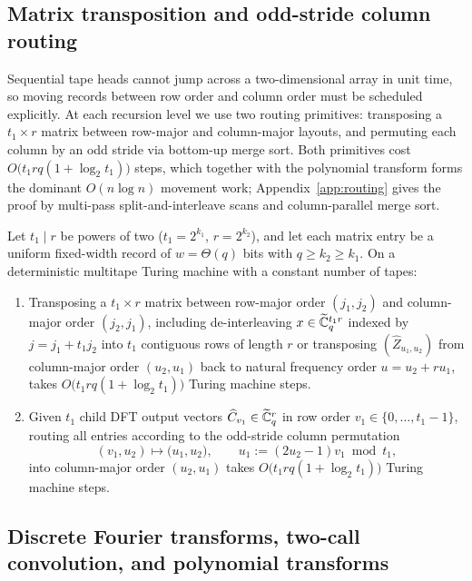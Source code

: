 \subsection{Matrix transposition and odd-stride column routing}\label{sec:routing}

Sequential tape heads cannot jump across a two-dimensional array in unit time, so moving records between row order and column order must be scheduled explicitly. At each recursion level we use two routing primitives: transposing a $t_1 \times r$ matrix between row-major and column-major layouts, and permuting each column by an odd stride via bottom-up merge sort. Both primitives cost $O\bigl(t_1 r q (1 + \log_2 t_1)\bigr)$ steps, which together with the polynomial transform forms the dominant $O(n \log n)$ movement work; Appendix~\ref{app:routing} gives the proof by multi-pass split-and-interleave scans and column-parallel merge sort.

\begin{lemma}\label{lem:routing}
Let $t_1 \mid r$ be powers of two ($t_1 = 2^{k_1}$, $r = 2^{k_2}$), and let each matrix entry be a uniform fixed-width record of $w = \Theta(q)$ bits with $q \ge k_2 \ge k_1$. On a deterministic multitape Turing machine with a constant number of tapes:
\begin{enumerate}[label=(\roman*),leftmargin=*]
  \item Transposing a $t_1 \times r$ matrix between row-major order $(j_1, j_2)$ and column-major order $(j_2, j_1)$, including de-interleaving $x \in \widetilde{\mathbb{C}}_q^{t_1 r}$ indexed by $j = j_1 + t_1 j_2$ into $t_1$ contiguous rows of length $r$ or transposing $(\widehat{Z}_{u_1, u_2})$ from column-major order $(u_2, u_1)$ back to natural frequency order $u = u_2 + r u_1$, takes $O\bigl(t_1 r q (1 + \log_2 t_1)\bigr)$ Turing machine steps.
  \item Given $t_1$ child DFT output vectors $\widehat{C}_{v_1} \in \widetilde{\mathbb{C}}_q^r$ in row order $v_1 \in \{0, \dots, t_1 - 1\}$, routing all entries according to the odd-stride column permutation
  \[
    (v_1, u_2) \longmapsto \bigl(u_1, u_2\bigr), \qquad u_1 := (2u_2 - 1) v_1 \bmod t_1,
  \]
  into column-major order $(u_2, u_1)$ takes $O\bigl(t_1 r q (1 + \log_2 t_1)\bigr)$ Turing machine steps.
\end{enumerate}
\end{lemma}

\subsection{Discrete Fourier transforms, two-call convolution, and polynomial transforms}\label{sec:prelim-dft}

